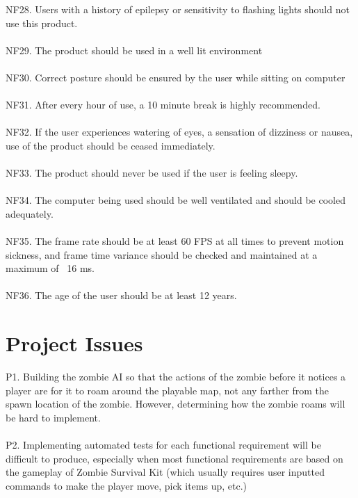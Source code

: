 \documentclass[12pt, titlepage]{article}
\begin{document}
{\color{magenta} NF28.} Users with a history of epilepsy or sensitivity to flashing lights should not use this product.
\\\\
{\color{magenta} NF29.} The product should be used in a well lit environment
\\\\
{\color{magenta} NF30.} Correct posture should be ensured by the user while sitting on computer
\\\\
{\color{magenta} NF31.} After every hour of use, a 10 minute break is highly recommended.
\\\\
{\color{magenta} NF32.} If the user experiences watering of eyes, a sensation of dizziness or nausea, use of the product should be ceased immediately.
\\\\
{\color{magenta} NF33.} The product should never be used if the user is feeling sleepy.
\\\\
{\color{magenta} NF34.} The computer being used should be well ventilated and should be cooled adequately.
\\\\
{\color{magenta} NF35.} The frame rate should be at least 60 FPS at all times to prevent motion sickness, and frame time variance should be checked and maintained at a maximum of ~16 ms.
\\\\
{\color{magenta} NF36.} The age of the user should be at least 12 years.


\section{Project Issues}
{\color{magenta} P1.} Building the zombie AI so that the actions of the zombie before it notices a player are for it to roam around the playable map, not any farther from the spawn location of the zombie. However, determining how the zombie roams will be hard to implement. 
\\\\
{\color{magenta} P2.} Implementing automated tests for each functional requirement will be difficult to produce, especially when most functional requirements are based on the gameplay of Zombie Survival Kit (which usually requires user inputted commands to make the player move, pick items up, etc.)
\end{document}

